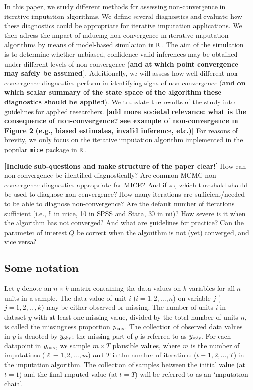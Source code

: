\documentclass[Royal,times,sageh]{sagej}
\begin{document}
In this paper, we study different methods for assessing non-convergence in iterative imputation algorithms. We define several diagnostics and evaluate how these diagnostics could be appropriate for iterative imputation applications. We then adress the impact of inducing non-convergence in iterative imputation algorithms by means of model-based simulation in \texttt{R} \citep{R}. The aim of the simulation is to determine whether unbiased, confidence-valid inferences may be obtained under different levels of non-convergence (\textbf{and at which point convergence may safely be assumed}). Additionally, we will assess how well different non-convergence diagnostics perform in identifying signs of non-convergence (\textbf{and on which scalar summary of the state space of the algorithm these diagnostics should be applied}). We translate the results of the study into guidelines for applied researchers. \textbf{{[}add more societal relevance: what is the consequence of non-convergence? see example of non-convergence in Figure 2 (e.g., biased estimates, invalid inference, etc.){]}} For reasons of brevity, we only focus on the iterative imputation algorithm implemented in the popular \texttt{mice} package \citep{mice} in \texttt{R} \citep{R}.

\textbf{{[}Include sub-questions and make structure of the paper clear!{]}} How can non-convergence be identified diagnostically? Are common MCMC non-convergence diagnostics appropriate for MICE? And if so, which threshold should be used to diagnose non-convergence? How many iterations are sufficient/needed to be able to diagnose non-convergence? Are the default number of iterations sufficient (i.e., 5 in mice, 10 in SPSS and Stata, 30 in mi)? How severe is it when the algorithm has not converged? And what are guidelines for practice? Can the parameter of interest \(Q\) be correct when the algorithm is not (yet) converged, and vice versa?

\hypertarget{some-notation}{%
\subsection{Some notation}\label{some-notation}}

Let \(y\) denote an \(n \times k\) matrix containing the data values on \(k\) variables for all \(n\) units in a sample. The data value of unit \(i\) (\(i = 1, 2, \dots, n\)) on variable \(j\) (\(j = 1, 2, \dots, k\)) may be either observed or missing. The number of units \(i\) in dataset \(y\) with at least one missing value, divided by the total number of units \(n\), is called the missingness proportion \(p_{\rm mis}\). The collection of observed data values in \(y\) is denoted by \(y_{\rm obs}\); the missing part of \(y\) is referred to as \(y_{\rm mis}\). For each datapoint in \(y_{\rm mis}\), we sample \(m \times T\) plausible values, where \(m\) is the number of imputations (\(\ell = 1, 2, \dots, m\)) and \(T\) is the number of iterations (\(t = 1, 2, \dots, T\)) in the imputation algorithm. The collection of samples between the initial value (at \(t=1\)) and the final imputed value (at \(t=T\)) will be referred to as an `imputation chain'.
\end{document}
